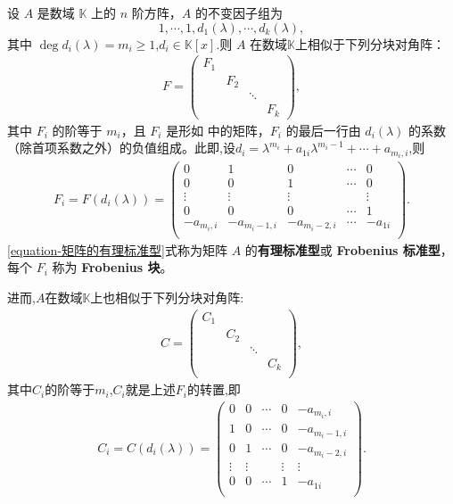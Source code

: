 \documentclass[../../main.tex]{subfiles}
\begin{document}
\begin{theorem}\label{theorem:有理标准型核心定理}
设 $A$ 是数域 $\mathbb{K}$ 上的 $n$ 阶方阵，$A$ 的不变因子组为
\[
1,\cdots,1,d_1(\lambda),\cdots,d_k(\lambda),
\]
其中 $\deg d_i(\lambda)=m_i\geqslant 1$,$d_i\in \mathbb{K}[x]$.则 $A$ 在数域$\mathbb{K}$上相似于下列分块对角阵：
\begin{align}\label{equation-矩阵的有理标准型}
F = \begin{pmatrix}
F_1 & & & \\
& F_2 & & \\
& & \ddots & \\
& & & F_k
\end{pmatrix},
\end{align}
其中 $F_i$ 的阶等于 $m_i$，且 $F_i$ 是形如 中的矩阵，$F_i$ 的最后一行由 $d_i(\lambda)$ 的系数（除首项系数之外）的负值组成。此即,设$d_i=\lambda ^{m_i}+a_{1i}\lambda ^{m_i-1}+\cdots +a_{m_i,i}$,则
\begin{align*}
F_i=F(d_i(\lambda))=\left( \begin{matrix}
0&		1&		0&		\cdots&		0\\
0&		0&		1&		\cdots&		0\\
\vdots&		\vdots&		\vdots&		&		\vdots\\
0&		0&		0&		\cdots&		1\\
-a_{m_i,i}&		-a_{m_i-1,i}&		-a_{m_i-2,i}&		\cdots&		-a_{1i}\\
\end{matrix} \right) .
\end{align*}
\eqref{equation-矩阵的有理标准型}式称为矩阵 $A$ 的\textbf{有理标准型}或 \textbf{Frobenius 标准型}，每个 $F_i$ 称为 \textbf{Frobenius 块}。

进而,$A$在数域$\mathbb{K}$上也相似于下列分块对角阵:
\begin{align*}
C=\left( \begin{matrix}
C_1&		&		&		\\
&		C_2&		&		\\
&		&		\ddots&		\\
&		&		&		C_k\\
\end{matrix} \right) ,
\end{align*}
其中$C_i$的阶等于$m_i$,$C_i$就是上述$F_i$的转置,即
\begin{align*}
C_i=C(d_i(\lambda ))=\left( \begin{matrix}
0&		0&		\cdots&		0&		-a_{m_i,i}\\
1&		0&		\cdots&		0&		-a_{m_i-1,i}\\
0&		1&		\cdots&		0&		-a_{m_i-2,i}\\
\vdots&		\vdots&		&		\vdots&		\vdots\\
0&		0&		\cdots&		1&		-a_{1i}\\
\end{matrix} \right) .
\end{align*}
\end{theorem}
\end{document}
